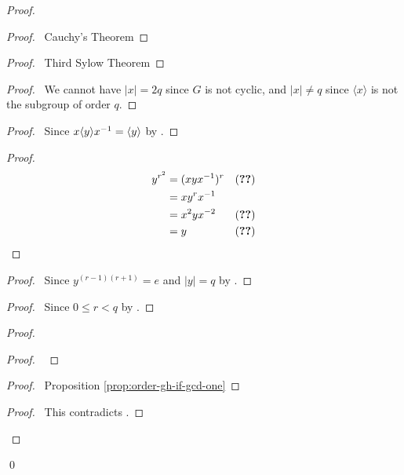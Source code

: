 \begin{proof}
\pf
{}
\begin{proof}
	\pf\ Cauchy's Theorem
\end{proof}
\begin{proof}
	\pf\ Third Sylow Theorem
\end{proof}
\begin{proof}
	\pf\ We cannot have $|x| = 2q$ since $G$ is not cyclic, and $|x| \neq q$ since $\langle x \rangle$ is not the subgroup of order $q$.
\end{proof}
\begin{proof}
	\pf\ Since $x \langle y \rangle {x}^{-1} = \langle y \rangle$ by .
\end{proof}
\begin{proof}
	\pf
	\begin{align*}
		y^{r^2} & = (xy \inv{x})^r & (\text{\stepref{6}}) \\
		& = x y^r \inv{x} \\
		& = x^2 y x^{-2} & (\text{\stepref{6}}) \\
		& = y & (\text{\stepref{4.5}})
	\end{align*}
\end{proof}
\begin{proof}
	\pf\ Since $y^{(r-1)(r+1)} = e$ and $|y| = q$ by .
\end{proof}
\begin{proof}
	\pf\ Since $0 \leq r < q$ by .
\end{proof}
\begin{proof}
	\begin{proof}
		\pf\ 
	\end{proof}
	\begin{proof}
		\pf\ Proposition \ref{prop:order-gh-if-gcd-one}
	\end{proof}
	\qedstep
	\begin{proof}
		\pf\ This contradicts .
	\end{proof}
\end{proof}
\qed
\end{proof}


